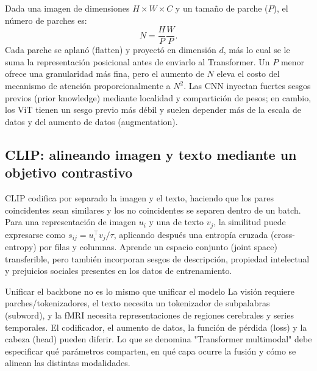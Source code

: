 Dada una imagen de dimensiones $H\times W\times C$ y un tamaño de parche ($P$), el número de parches es:
\[
N=\frac{H}{P}\frac{W}{P}.
\]
Cada parche se aplanó (flatten) y proyectó en dimensión $d$, más lo cual se le suma la representación posicional antes de enviarlo al Transformer. Un $P$ menor ofrece una granularidad más fina, pero el aumento de $N$ eleva el costo del mecanismo de atención proporcionalmente a $N^2$. Las CNN inyectan fuertes sesgos previos (prior knowledge) mediante localidad y compartición de pesos; en cambio, los ViT tienen un sesgo previo más débil y suelen depender más de la escala de datos y del aumento de datos (augmentation).


\subsection{CLIP: alineando imagen y texto mediante un objetivo contrastivo}

CLIP codifica por separado la imagen y el texto, haciendo que los pares coincidentes sean similares y los no coincidentes se separen dentro de un batch. Para una representación de imagen $u_i$ y una de texto $v_j$, la similitud puede expresarse como $s_{ij}=u_i^{\top}v_j/\tau$, aplicando después una entropía cruzada (cross-entropy) por filas y columnas. Aprende un espacio conjunto (joint space) transferible, pero también incorporan sesgos de descripción, propiedad intelectual y prejuicios sociales presentes en los datos de entrenamiento.



\begin{importantbox}{Unificar el backbone no es lo mismo que unificar el modelo}
La visión requiere parches/tokenizadores, el texto necesita un tokenizador de subpalabras (subword), y la fMRI necesita representaciones de regiones cerebrales y series temporales. El codificador, el aumento de datos, la función de pérdida (loss) y la cabeza (head) pueden diferir. Lo que se denomina "Transformer multimodal" debe especificar qué parámetros comparten, en qué capa ocurre la fusión y cómo se alinean las distintas modalidades.
\end{importantbox}

